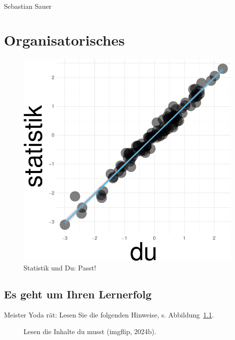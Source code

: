 \documentclass[
  letterpaper,
]{scrbook}
\theoremstyle{definition}
\theoremstyle{definition}
\theoremstyle{definition}
\theoremstyle{remark}
\begin{document}
Sebastian Sauer


\chapter{Organisatorisches}\label{organisatorisches}

\begin{figure}[H]

{\centering \includegraphics[width=0.33\linewidth,height=\textheight,keepaspectratio]{005-orga_files/figure-pdf/statistik-und-du-guter-fit-1.pdf}

}

\caption{Statistik und Du: Passt!}

\end{figure}%

\section{Es geht um Ihren Lernerfolg}\label{es-geht-um-ihren-lernerfolg}

Meister Yoda rät: Lesen Sie die folgenden Hinweise, s.
Abbildung~\ref{fig-yoda}.

\begin{figure}


\caption{\label{fig-yoda}Lesen die Inhalte du musst (imgflip, 2024b).}

\end{figure}%
\end{document}
